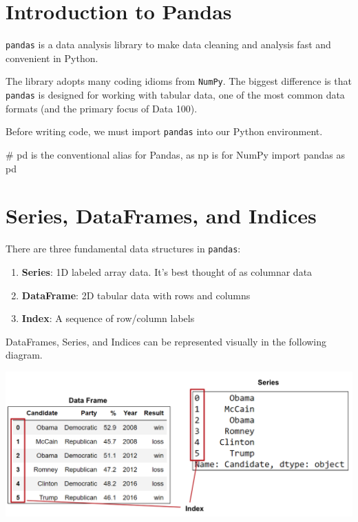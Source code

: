 \documentclass[
  letterpaper,
  DIV=11,
  numbers=noendperiod]{scrreprt}
\newenvironment{Shaded}{\begin{snugshade}}{\end{snugshade}}
\newcommand{\CommentTok}[1]{\textcolor[rgb]{0.37,0.37,0.37}{#1}}
\newcommand{\ImportTok}[1]{\textcolor[rgb]{0.00,0.46,0.62}{#1}}
\newcommand{\NormalTok}[1]{\textcolor[rgb]{0.00,0.23,0.31}{#1}}
\providecommand{\tightlist}{%
  \setlength{\itemsep}{0pt}\setlength{\parskip}{0pt}}\usepackage{longtable,booktabs,array}
\begin{document}
\hypertarget{introduction-to-pandas}{%
\section{Introduction to Pandas}\label{introduction-to-pandas}}

\texttt{pandas} is a data analysis library to make data cleaning and
analysis fast and convenient in Python.

The library adopts many coding idioms from \texttt{NumPy}. The biggest
difference is that \texttt{pandas} is designed for working with tabular
data, one of the most common data formats (and the primary focus of Data
100).

Before writing code, we must import \texttt{pandas} into our Python
environment.

\begin{Shaded}
\begin{Highlighting}[]
\CommentTok{\# \textasciigrave{}pd\textasciigrave{} is the conventional alias for Pandas, as \textasciigrave{}np\textasciigrave{} is for NumPy}
\ImportTok{import}\NormalTok{ pandas }\ImportTok{as}\NormalTok{ pd}
\end{Highlighting}
\end{Shaded}

\hypertarget{series-dataframes-and-indices}{%
\section{Series, DataFrames, and
Indices}\label{series-dataframes-and-indices}}

There are three fundamental data structures in \texttt{pandas}:

\begin{enumerate}
\def\labelenumi{\arabic{enumi}.}
\tightlist
\item
  \textbf{Series}: 1D labeled array data. It's best thought of as
  columnar data
\item
  \textbf{DataFrame}: 2D tabular data with rows and columns
\item
  \textbf{Index}: A sequence of row/column labels
\end{enumerate}

DataFrames, Series, and Indices can be represented visually in the
following diagram.

\includegraphics{pandas_1/images/df_series_index.png}
\end{document}
